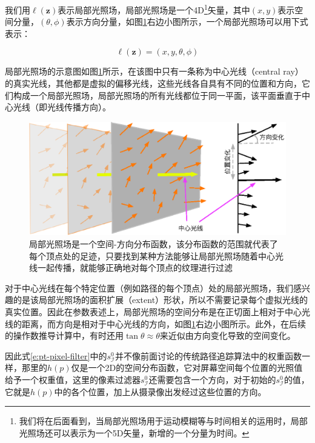 我们用$\ell(\mathbf{z})$表示局部光照场，局部光照场是一个4D\footnote{我们将在后面看到，当局部光照场用于运动模糊等与时间相关的运用时，局部光照场还可以表示为一个5D矢量，新增的一个分量为时间。}矢量，其中$(x,y )$表示空间分量，$(\theta,\phi)$表示方向分量，如图\ref{f:pt-local-light-field}右边小图所示，一个局部光照场可以用下式表示：

\begin{equation}
	\ell(\mathbf{z})=(x,y,\theta,\phi)
\end{equation}

局部光照场的示意图如图\ref{f:pt-local-light-field}所示，在该图中只有一条称为中心光线（central ray）的真实光线，其他都是虚拟的偏移光线，这些光线各自具有不同的位置和方向，它们构成一个局部光照场，局部光照场的所有光线都位于同一平面，该平面垂直于中心光线（即光线传播方向）。

\begin{figure}
	\includegraphics[width=\textwidth]{figures/pt/local-light-field}
	\caption{局部光照场是一个空间-方向分布函数，该分布函数的范围就代表了每个顶点处的足迹，只要找到某种方法能够让局部光照场随着中心光线一起传播，就能够正确地对每个顶点的纹理进行过滤}
	\label{f:pt-local-light-field}
\end{figure}

对于中心光线在每个特定位置（例如路径的每个顶点）处的局部光照场，我们感兴趣的是该局部光照场的面积扩展（extent）形状，所以不需要记录每个虚拟光线的真实位置。因此在参数表述上，局部光照场的空间分布是在正切面上相对于中心光线的距离，而方向是相对于中心光线的方向，如图\ref{f:pt-local-light-field}右边小图所示。此外，在后续的操作数推导计算中，有时还用$\tan \theta\approx\theta$来近似由方向变化导致的空间变化。

因此式\ref{e:pt-pixel-filter}中的$s^{0}_{\mathcal{I}}$并不像前面讨论的传统路径追踪算法中的权重函数一样，那里的$h(p)$仅是一个2D的空间分布函数，它对屏幕空间每个位置的光照值给予一个权重值，这里的像素过滤器$s^{0}_{\mathcal{I}}$还需要包含一个方向，对于初始的$s^{0}_{\mathcal{I}}$的值，它就是$h(p)$中的各个位置，加上从摄录像出发经过这些位置的方向。

